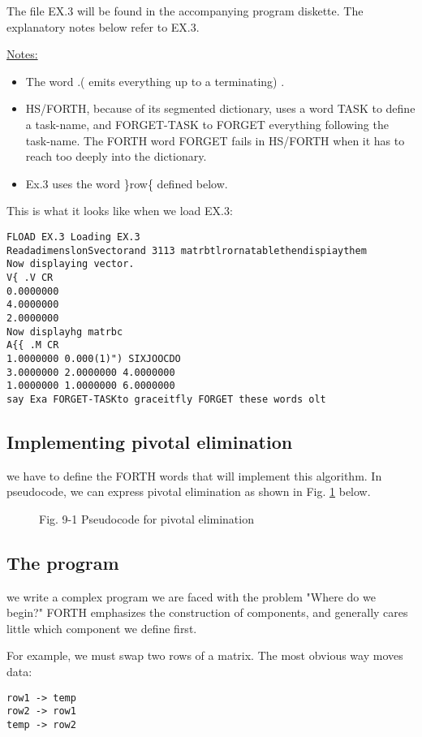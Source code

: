 The file EX.3 will be found in the accompanying program diskette. The explanatory notes below refer to EX.3.

\underline{Notes:}

\begin{itemize}
  \item The word .( emits everything up to a terminating) .
  \item HS/FORTH, because of its segmented dictionary, uses a word TASK to define a task-name, and FORGET-TASK to FORGET everything following the task-name. The FORTH word FORGET fails in HS/FORTH when it has to reach too deeply into the dictionary.
  \item Ex.3 uses the word \}row\{ defined below.
\end{itemize}

This is what it looks like when we load EX.3:

\begin{verbatim}
FLOAD EX.3 Loading EX.3
ReadadimenslonSvectorand 3113 matrbtlrornatablethendispiaythem
Now displaying vector.
V{ .V CR
0.0000000
4.0000000
2.0000000
Now displayhg matrbc
A{{ .M CR
1.0000000 0.000(1)") SIXJOOCDO
3.0000000 2.0000000 4.0000000
1.0000000 1.0000000 6.0000000
say Exa FORGET-TASKto graceitfly FORGET these words olt
\end{verbatim}

\subsection{Implementing pivotal elimination}
 we have to define the FORTH words that will implement
this algorithm. In pseudocode, we can express pivotal elimination as shown in Fig. \ref{fig:09_01} below.

 
\begin{figure}
    \caption{
        Fig. 9-1 Pseudocode for pivotal elimination}
    \label{fig:09_01}
\end{figure}
\subsection{The program}
 we write a complex program we are faced with the
problem "Where do we begin?" FORTH emphasizes the construction of components,
and generally cares little which component
we define first.

For example, we must swap two rows of a matrix. The most
obvious way moves data:

\begin{verbatim}
row1 -> temp
row2 -> row1
temp -> row2
\end{verbatim}


